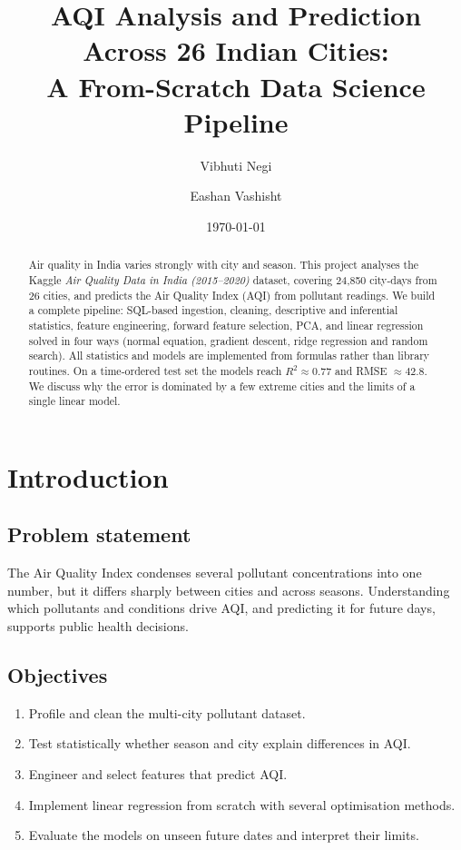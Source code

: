 \documentclass[11pt,a4paper]{article}
\title{\textbf{AQI Analysis and Prediction Across 26 Indian Cities:\\A From-Scratch Data Science Pipeline}}
\author{Vibhuti Negi \and Eashan Vashisht}
\date{\today}
\begin{document}
\maketitle

\begin{abstract}
Air quality in India varies strongly with city and season. This project analyses the Kaggle \emph{Air Quality Data in India (2015--2020)} dataset, covering 24{,}850 city-days from 26 cities, and predicts the Air Quality Index (AQI) from pollutant readings. We build a complete pipeline: SQL-based ingestion, cleaning, descriptive and inferential statistics, feature engineering, forward feature selection, PCA, and linear regression solved in four ways (normal equation, gradient descent, ridge regression and random search). All statistics and models are implemented from formulas rather than library routines. On a time-ordered test set the models reach $R^2\approx0.77$ and RMSE $\approx 42.8$. We discuss why the error is dominated by a few extreme cities and the limits of a single linear model.
\end{abstract}

\section{Introduction}
\subsection{Problem statement}
The Air Quality Index condenses several pollutant concentrations into one number, but it differs sharply between cities and across seasons. Understanding which pollutants and conditions drive AQI, and predicting it for future days, supports public health decisions.

\subsection{Objectives}
\begin{enumerate}
\item Profile and clean the multi-city pollutant dataset.
\item Test statistically whether season and city explain differences in AQI.
\item Engineer and select features that predict AQI.
\item Implement linear regression from scratch with several optimisation methods.
\item Evaluate the models on unseen future dates and interpret their limits.
\end{enumerate}
\end{document}
